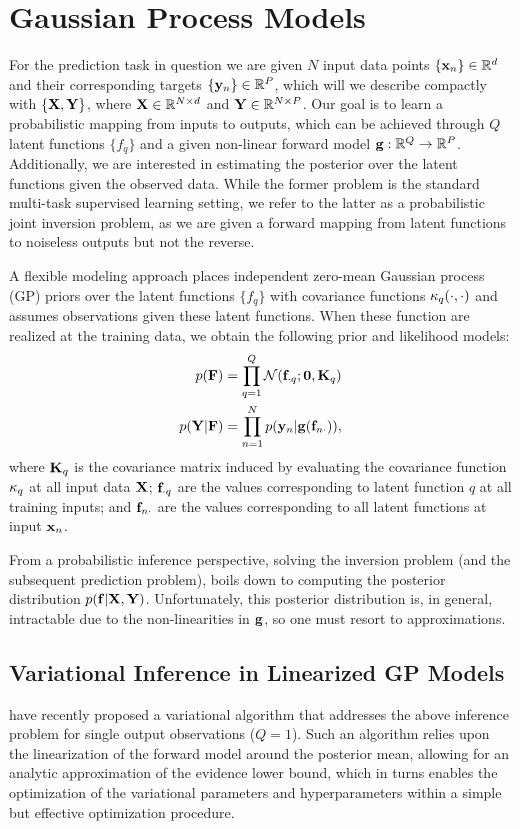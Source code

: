 \section{Gaussian Process Models}
For the prediction task in question we are given $N$ input data points $ \{ \mathbf{x}_n  \} \in \mathbb{R}^{d}$ and their corresponding  
targets $\{ \mathbf{y}_n  \} \in \mathbb{R}^{P}$, which will  we describe compactly with $\left\{{\mathbf{X}, \mathbf{Y}}\right\}$,
where $\mathbf{X} \in \mathbb{R}^{N \times d}$  and $\mathbf{Y} \in \mathbb{R}^{N \times P}$. Our goal is 
to learn a probabilistic mapping from inputs to outputs, which can be achieved through $Q$ latent  functions $\{ f_q \}$ and a given non-linear forward model $\mathbf{g} : \mathbb{R}^{Q} \to \mathbb{R}^{P}$. Additionally, we are interested in estimating the posterior over the latent functions given the observed data. 
While the former problem  is the standard multi-task supervised learning setting, we refer 
to the latter  as a probabilistic joint inversion problem, as we are given a forward mapping from 
latent functions to noiseless outputs but not the reverse. 

A  flexible modeling approach places independent zero-mean Gaussian process (GP) priors over 
the latent functions $\{ f_q \}$ with covariance functions $\kappa_q(\cdot, \cdot)$ and assumes
 \iid observations given these latent functions. When these function are realized at the training data,
we obtain the following prior and likelihood models:
\begin{align}
	\label{eq:gp-model-1}
	p(\mathbf{F})  &=  \prod_{q=1}^{Q} \mathcal{N}(\mathbf{f}_{\cdot q}; \mathbf{0}, \mathbf{K}_q) \\
	\label{eq:gp-model-2}	
	p(\mathbf{Y} | \mathbf{F}) &= \prod_{n=1}^N p(\mathbf{y}_n | \mathbf{g} ( \mathbf{f}_{n \cdot} )) \text{,}
\end{align}
where $\mathbf{K}_q$ is the covariance matrix induced by evaluating  the covariance 
function $\kappa_q$ at all input data $\mathbf{X}$; $\mathbf{f}_{\cdot q}$ are  the values 
corresponding to latent function $q$ at all training inputs; 
and $\mathbf{f}_{n \cdot}$ are  the values corresponding to all latent functions at input $\mathbf{x}_n$. 

From a probabilistic inference perspective, solving the inversion problem (and the 
subsequent prediction problem), boils down to computing the posterior distribution 
$p(\mathbf{f} | \mathbf{X}, \mathbf{Y})$. Unfortunately, this posterior distribution is, in general, 
intractable due to the non-linearities in $\mathbf{g}$, so one must resort to approximations.
%
\subsection{Variational Inference in Linearized GP Models}
\citet{steinberg-bonilla-nips-2014} have recently proposed a variational  algorithm that
addresses the above inference problem for single output observations ($Q=1$).  
Such an algorithm relies upon the linearization of the forward model around the posterior 
mean, allowing for an analytic approximation of the evidence lower bound, which in turns 
enables the optimization of the variational parameters and hyperparameters within a simple 
but effective optimization procedure.  

